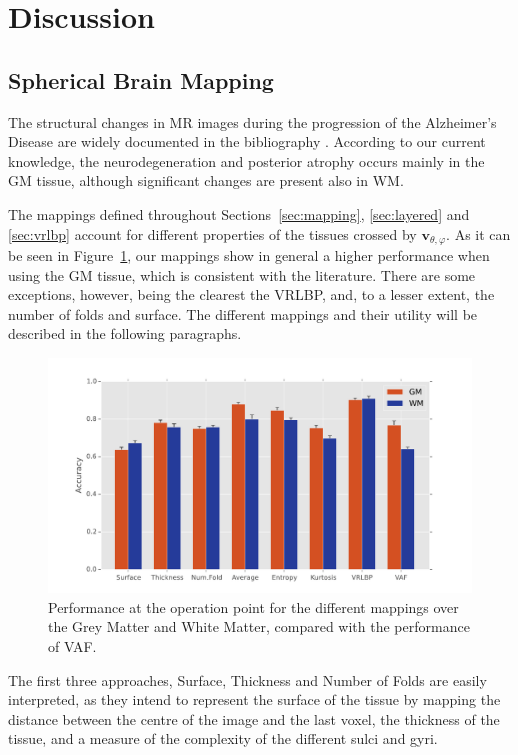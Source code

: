 \section{Discussion}
\subsection{Spherical Brain Mapping}
The structural changes in MR images during the progression of the Al\-zhei\-mer's Disease are widely documented in the bibliography \cite{Misra2009,Baron2001,Pievani2013,Stoeckel04,han2006reliability,Fischl2004}. According to our current knowledge, the neurodegeneration and posterior atrophy occurs mainly in the \ac{GM} tissue, although significant changes are present also in \ac{WM}. 

The mappings defined throughout Sections~\ref{sec:mapping}, \ref{sec:layered} and \ref{sec:vrlbp} account for different properties of the tissues crossed by $\mathbf{v}_{\theta,\varphi}$. As it can be seen in Figure~\ref{fig:performance}, our mappings show in general a higher performance when using the \ac{GM} tissue, which is consistent with the literature. There are some exceptions, however, being the clearest the VRLBP, and, to a lesser extent, the number of folds and surface. The different mappings and their utility will be described in the following paragraphs. 

\begin{figure}[htp]
	\centering
	\includegraphics[width=0.9\columnwidth]{Graphics/ch6/12-performance}
	\caption{Performance at the operation point for the different mappings over the Grey Matter and White Matter, compared with the performance of \ac{VAF}.}
	\label{fig:performance}
\end{figure}

The first three approaches, Surface, Thickness and Number of Folds are easily interpreted, as they intend to represent the surface of the tissue by mapping the distance between the centre of the image and the last voxel, the thickness of the tissue, and a measure of the complexity of the different sulci and gyri. 

